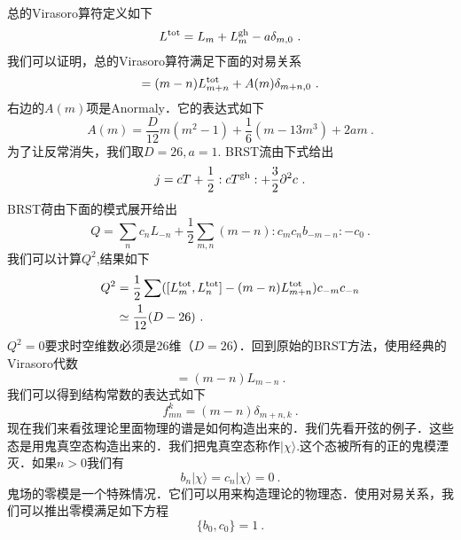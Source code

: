 总的Virasoro算符定义如下
\begin{equation}
L^{\rm tot} = L_m + L^{\rm gh}_m - a \delta_{m,0}~.
\end{equation}
我们可以证明，总的Virasoro算符满足下面的对易关系
\begin{equation}
[L^{\rm tot}_m,L^{\rm tot}_n] = (m-n) L^{\rm tot}_{m+n} + A(m) \delta_{m+n,0}~. 
\end{equation}
右边的$A(m)$项是Anormaly．它的表达式如下
\begin{equation}
A(m) = \frac{D}{12} m (m^2-1) + \frac{1}{6} (m-13 m^3) + 2 a m~. 
\end{equation}
为了让反常消失，我们取$D=26,a=1$. BRST流由下式给出
\begin{equation}
j = c T+ \frac{1}{2} : c T^{\rm gh} : + \frac{3}{2} \partial^2 c~.
\end{equation}
BRST荷由下面的模式展开给出
\begin{equation}
Q = \sum_n c_n L_{-n} + \frac{1}{2} \sum_{m,n} (m-n) :c_m c_n b_{-m-n}: -c_0~.
\end{equation}
我们可以计算$Q^2$,结果如下
\begin{equation}
\begin{aligned}
Q^2&  = \frac{1}{2} \sum ( [L^{\rm tot}_m,L^{\rm tot}_n] - (m-n) L^{\rm tot}_{m+n} ) c_{-m} c_{-n} \\
& \simeq \frac{1}{12} (D-26)~.
\end{aligned}
\end{equation}
$Q^2=0$要求时空维数必须是26维（$D=26$）．回到原始的BRST方法，使用经典的Virasoro代数
\begin{equation}
[L_m,L_n]=(m-n)L_{m-n}~.
\end{equation}
我们可以得到结构常数的表达式如下
\begin{equation}
f^k_{mn} = (m-n) \delta_{m+n,k}~.
\end{equation}
现在我们来看弦理论里面物理的谱是如何构造出来的．我们先看开弦的例子．这些态是用鬼真空态构造出来的．我们把鬼真空态称作$|\chi\rangle$.这个态被所有的正的鬼模湮灭．如果$n>0$我们有
\begin{equation}
b_n|\chi\rangle = c_n|\chi\rangle = 0~.
\end{equation}
鬼场的零模是一个特殊情况．它们可以用来构造理论的物理态．使用对易关系，我们可以推出零模满足如下方程
\begin{equation}
\{b_0,c_0\} = 1~.
\end{equation}






















